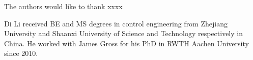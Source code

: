 \documentclass[10pt,journal,compsoc]{IEEEtran}
\theoremstyle{mytheoremstyle}
\theoremstyle{mytheoremstyle}
\theoremstyle{mytheoremstyle}
\begin{document}
The authors would like to thank xxxx


\ifCLASSOPTIONcaptionsoff
  \newpage
\fi





%
%
%










% 
\begin{IEEEbiography}{Di Li}
received BE and MS degrees in control engineering from Zhejiang University and Shaanxi University of Science and Technology respectively in China.
He worked with James Gross for his PhD in RWTH Aachen University since 2010.
\end{IEEEbiography}
\end{document}
